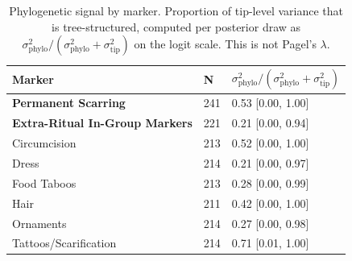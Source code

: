 \begin{table}[!ht]
\centering
\small
\caption{Phylogenetic signal by marker. Proportion of tip-level variance that is tree-structured, computed per posterior draw as $\sigma^2_{\mathrm{phylo}} / (\sigma^2_{\mathrm{phylo}} + \sigma^2_{\mathrm{tip}})$ on the logit scale. This is not Pagel's $\lambda$.}
\label{tab:int_phylo_signal}
\begin{tabular}{lll}
\toprule
Marker & N & $\sigma^2_{\mathrm{phylo}} / (\sigma^2_{\mathrm{phylo}} + \sigma^2_{\mathrm{tip}})$ \\
\midrule
\textbf{Permanent Scarring} & 241 & 0.53 [0.00, 1.00] \\
\textbf{Extra-Ritual In-Group Markers} & 221 & 0.21 [0.00, 0.94] \\
\midrule
Circumcision & 213 & 0.52 [0.00, 1.00] \\
Dress & 214 & 0.21 [0.00, 0.97] \\
Food Taboos & 213 & 0.28 [0.00, 0.99] \\
Hair & 211 & 0.42 [0.00, 1.00] \\
Ornaments & 214 & 0.27 [0.00, 0.98] \\
Tattoos/Scarification & 214 & 0.71 [0.01, 1.00] \\
\bottomrule
\end{tabular}
\end{table}
